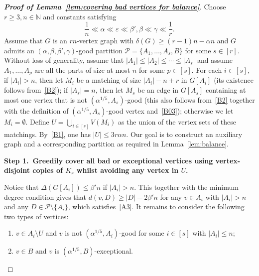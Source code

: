 \documentclass[11pt, a4paper]{article}
\theoremstyle{definition}
\newcommand{\eps}{\varepsilon}
\newcommand{\<}{\subseteq}
\newcommand{\de}{\delta}
\begin{document}
\begin{proof}[{\bf Proof of Lemma~\ref{lem:covering bad vertices for balance}}]
Choose $r\geq 3,n\in \mathbb{N}$ and constants satisfying %
$$\frac{1}{n}\ll \alpha\ll\eps\ll\beta',  \beta\ll\gamma\ll \frac{1}{r}.$$ 
Assume that $G$ is an $rn$-vertex graph with $\de(G)\geq (r-1)n-\alpha n$ and $G$ admits an $(\alpha,\beta,\beta',\gamma)$-good partition $\mathcal{P}=\{A_1,\ldots,A_s,B\}$ {for some  $s\in [r]$}. Without loss of generality, assume that $|A_1|\leq |A_2|\leq \cdots\leq |A_s|$  and assume $A_1,\ldots,A_p$ are all the parts of size at most $n$ for some $p\in[s]$. 
For each $i \in [s]$, if $|A_i| > n$, then let $M_i$ be a matching of size $|A_i| - n + r$ in $G[A_i]$ (its existence follows from~\ref{B2}); {if $|A_s| = n$, then let $M_s$ be an edge in $G[A_s]$ containing at most one vertex that is not $(\alpha^{1/5},A_s)$-good (this also follows from~\ref{B2} together with the definition of $(\alpha^{1/5},A_s)$-good vertex and~\ref{B03});} %
otherwise we let $M_i = \emptyset$. Define $U = \bigcup_{i \in [s]} V(M_i)$ as the union of the vertex sets of these matchings. By~\ref{B1}, one has $|U| \leq 3r\alpha n$. %
Our goal is to construct an auxiliary graph and a corresponding partition as required in Lemma~\ref{lem:balance}. 

\medskip
{\bf Step 1.~Greedily cover all bad or exceptional vertices using vertex-disjoint copies of $K_r$ whilst avoiding any vertex in $U$.}
\medskip%

Notice that $\Delta(G[A_i])\leq \beta' n$ if $|A_i|>n$. This together with the minimum degree condition gives that $d(v,D)\geq |D|-2{\beta'} n$ for any $v\in A_i$ with $|A_i|> n$ and any $D\in \mathcal{P}\setminus \{A_i\}$, {which satisfies~\ref{A3}}. It remains to consider the following two types of vertices:  %
\begin{enumerate}[label =\rm  {\bf Type \arabic{enumi}.}, ref = \rm {\bf Type \arabic{enumi}},  leftmargin=6em]
    \item\label{v1} $v\in A_i\setminus U$ and $v$ is not $(\alpha^{1/5},A_i)$-good  for some $i\in [s]$ with $|A_i|\leq n$;
    \item\label{v2} %
    $v\in B$ and $v$ is $(\alpha^{1/5},B)$-exceptional. 
\end{enumerate}





\end{proof}
\end{document}
